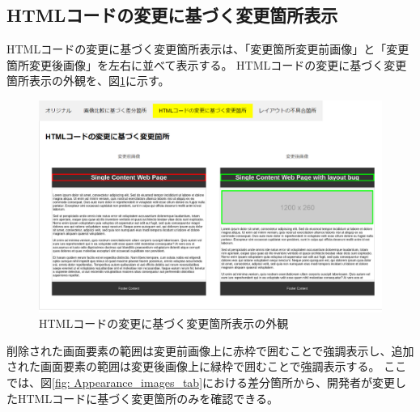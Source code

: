 \subsection{HTMLコードの変更に基づく変更箇所表示}\label{subsec:html_tab}
HTMLコードの変更に基づく変更箇所表示は、「変更箇所変更前画像」と「変更箇所変更後画像」を左右に並べて表示する。
HTMLコードの変更に基づく変更箇所表示の外観を、図\ref{fig: Appearance_html_tab}に示す。
\begin{figure}[tp]
    \begin{center}
        \includegraphics[width=1.0\columnwidth]{image/new_html.png}
        \caption{HTMLコードの変更に基づく変更箇所表示の外観}
        \label{fig: Appearance_html_tab}
    \end{center}
\end{figure}
削除された画面要素の範囲は変更前画像上に赤枠で囲むことで強調表示し、追加された画面要素の範囲は変更後画像上に緑枠で囲むことで強調表示する。
ここでは、図\ref{fig: Appearance_images_tab}における差分箇所から、開発者が変更したHTMLコードに基づく変更箇所のみを確認できる。


